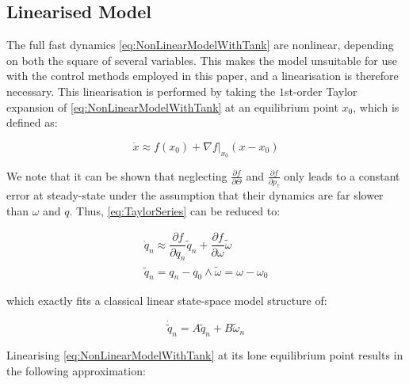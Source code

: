 \subsection{Linearised Model}

The full fast dynamics \cref{eq:NonLinearModelWithTank} are nonlinear, depending on both the square of several variables. This makes the model unsuitable for use with the control methods employed in this paper, and a linearisation is therefore necessary. This linearisation is performed by taking the $1$st-order Taylor expansion of \cref{eq:NonLinearModelWithTank} at an equilibrium point $x_0$, which is defined as:

\begin{equation}\label{eq:TaylorSeries}
	\dot{x} \approx f(x_0) + \nabla f\bigg\rvert_{x_0} (x-x_0)
\end{equation}

We note that it can be shown that neglecting $\frac{\partial f}{\partial \Theta}$ and $\frac{\partial f}{\partial p_\tau}$ only leads to a constant error at steady-state under the assumption that their dynamics are far slower than $\omega$ and $q$. Thus, \cref{eq:TaylorSeries} can be reduced to:

\begin{equation}\label{eq:TaylorSeriesSimple}
\begin{gathered}
	\dot{q}_n \approx \dfrac{\partial f}{\partial q_n} \tilde{q}_n + \dfrac{\partial f}{\partial \omega} \tilde{\omega} \\
	\tilde{q}_n = q_n-q_0 \wedge \tilde{\omega} = \omega-\omega_0
\end{gathered}
\end{equation}

which exactly fits a classical linear state-space model structure of:

\begin{equation}\label{eq:}
	\dot{\tilde{q}}_n = A\tilde{q}_n + B \tilde{\omega}_n
\end{equation}

Linearising \cref{eq:NonLinearModelWithTank} at its lone equilibrium point results in the following approximation:

